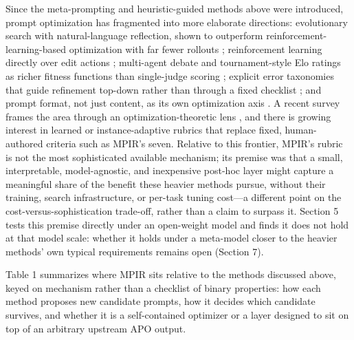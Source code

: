 \documentclass[a4paper,fleqn]{cas-sc}
\begin{document}
Since the meta-prompting and heuristic-guided methods above were introduced, prompt optimization has fragmented into more elaborate directions: evolutionary search with natural-language reflection, shown to outperform reinforcement-learning-based optimization with far fewer rollouts \citep{agrawal2026}; reinforcement learning directly over edit actions \citep{lin2025}; multi-agent debate and tournament-style Elo ratings as richer fitness functions than single-judge scoring \citep{nair2025}; explicit error taxonomies that guide refinement top-down rather than through a fixed checklist \citep{singh2026}; and prompt format, not just content, as its own optimization axis \citep{liu2025}. A recent survey frames the area through an optimization-theoretic lens \citep{li2025}, and there is growing interest in learned or instance-adaptive rubrics that replace fixed, human-authored criteria such as MPIR's seven. Relative to this frontier, MPIR's rubric is not the most sophisticated available mechanism; its premise was that a small, interpretable, model-agnostic, and inexpensive post-hoc layer might capture a meaningful share of the benefit these heavier methods pursue, without their training, search infrastructure, or per-task tuning cost---a different point on the cost-versus-sophistication trade-off, rather than a claim to surpass it. Section 5 tests this premise directly under an open-weight model and finds it does not hold at that model scale: whether it holds under a meta-model closer to the heavier methods' own typical requirements remains open (Section 7).

Table 1 summarizes where MPIR sits relative to the methods discussed above, keyed on mechanism rather than a checklist of binary properties: how each method proposes new candidate prompts, how it decides which candidate survives, and whether it is a self-contained optimizer or a layer designed to sit on top of an arbitrary upstream APO output.
\end{document}
